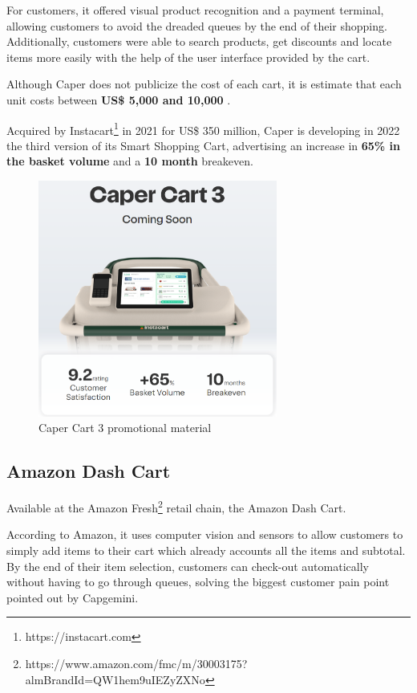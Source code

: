 \documentclass[openright]{normas-utf-tex} %
\begin{document}
For customers, it offered visual product recognition and a payment terminal,
allowing customers to avoid the dreaded queues by the end of their shopping.
Additionally, customers were able to search products, get discounts and locate
items more easily with the help of the user interface provided by the cart.

Although Caper does not publicize the cost of each cart, it is estimate that each unit costs between
\textbf{US\$ 5,000 and 10,000} \cite{TWP2021}.

Acquired by Instacart\footnote{https://instacart.com} in 2021 for US\$ 350 million, Caper is developing in 2022 the 
third version of its Smart Shopping Cart, advertising an increase in \textbf{65\% in the basket
volume} and a \textbf{10 month} breakeven.

\begin{figure}[H]
	\centering
	\includegraphics[width=0.7\textwidth]{./images/capercart3.png}
	\caption[Caper Cart 3 promotional material]{Caper Cart 3 promotional material}
	\label{fig:nextop}
\end{figure}


\subsection{Amazon Dash Cart}

Available at the Amazon Fresh\footnote{https://www.amazon.com/fmc/m/30003175?almBrandId=QW1hem9uIEZyZXNo} retail chain, the
Amazon Dash Cart.

According to Amazon, it uses computer vision and sensors to allow customers to
simply add items to their cart which already accounts all the items and
subtotal. By the end of their item selection, customers can check-out
automatically without having to go through queues, solving the biggest customer
pain point pointed out by Capgemini.
\end{document}
